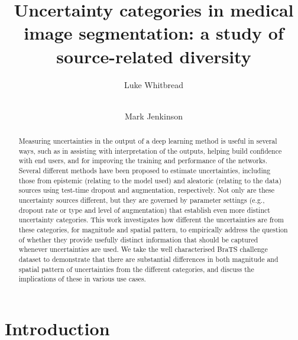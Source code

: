 \documentclass[runningheads]{llncs}
\begin{document}
%
\title{Uncertainty categories in medical image segmentation: a study of source-related diversity}
%
%
\author{Luke Whitbread \and
\\ Mark Jenkinson}
%
%


\maketitle

\begin{abstract}
Measuring uncertainties in the output of a deep learning method is useful in several ways, such as in assisting with interpretation of the outputs, helping build confidence with end users, and for improving the training and performance of the networks. Several different methods have been proposed to estimate uncertainties, including those from epistemic (relating to the model used) and aleatoric (relating to the data) sources using test-time dropout and augmentation, respectively. Not only are these uncertainty sources different, but they are governed by parameter settings (e.g., dropout rate or type and level of augmentation) that establish even more distinct uncertainty categories. This work investigates how different the uncertainties are from these categories, for magnitude and spatial pattern, to empirically address the question of whether they provide usefully distinct information that should be captured whenever uncertainties are used. We take the well characterised BraTS challenge dataset to demonstrate that there are substantial differences in both magnitude and spatial pattern of uncertainties from the different categories, and discuss the implications of these in various use cases.

\end{abstract}

\section{Introduction}
\end{document}
